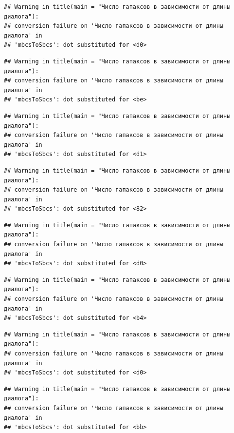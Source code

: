 \documentclass[
]{book}
\theoremstyle{definition}
\theoremstyle{definition}
\theoremstyle{definition}
\theoremstyle{definition}
\theoremstyle{remark}
\begin{document}
\begin{verbatim}
## Warning in title(main = "Число гапаксов в зависимости от длины диалога"):
## conversion failure on 'Число гапаксов в зависимости от длины диалога' in
## 'mbcsToSbcs': dot substituted for <d0>
\end{verbatim}

\begin{verbatim}
## Warning in title(main = "Число гапаксов в зависимости от длины диалога"):
## conversion failure on 'Число гапаксов в зависимости от длины диалога' in
## 'mbcsToSbcs': dot substituted for <be>
\end{verbatim}

\begin{verbatim}
## Warning in title(main = "Число гапаксов в зависимости от длины диалога"):
## conversion failure on 'Число гапаксов в зависимости от длины диалога' in
## 'mbcsToSbcs': dot substituted for <d1>
\end{verbatim}

\begin{verbatim}
## Warning in title(main = "Число гапаксов в зависимости от длины диалога"):
## conversion failure on 'Число гапаксов в зависимости от длины диалога' in
## 'mbcsToSbcs': dot substituted for <82>
\end{verbatim}

\begin{verbatim}
## Warning in title(main = "Число гапаксов в зависимости от длины диалога"):
## conversion failure on 'Число гапаксов в зависимости от длины диалога' in
## 'mbcsToSbcs': dot substituted for <d0>
\end{verbatim}

\begin{verbatim}
## Warning in title(main = "Число гапаксов в зависимости от длины диалога"):
## conversion failure on 'Число гапаксов в зависимости от длины диалога' in
## 'mbcsToSbcs': dot substituted for <b4>
\end{verbatim}

\begin{verbatim}
## Warning in title(main = "Число гапаксов в зависимости от длины диалога"):
## conversion failure on 'Число гапаксов в зависимости от длины диалога' in
## 'mbcsToSbcs': dot substituted for <d0>
\end{verbatim}

\begin{verbatim}
## Warning in title(main = "Число гапаксов в зависимости от длины диалога"):
## conversion failure on 'Число гапаксов в зависимости от длины диалога' in
## 'mbcsToSbcs': dot substituted for <bb>
\end{verbatim}
\end{document}
